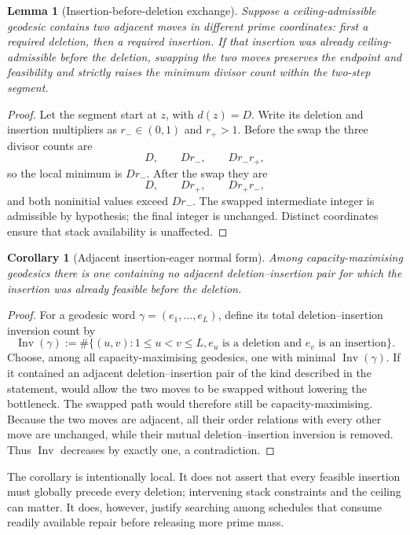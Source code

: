 \documentclass[11pt]{article}
\numberwithin{equation}{section}
\theoremstyle{blueplain}
\newtheorem{lemma}[theorem]{Lemma}
\newtheorem{corollary}[theorem]{Corollary}
\theoremstyle{bluedef}
\begin{document}
\begin{lemma}[Insertion-before-deletion exchange]
\label{lem:exchange}
Suppose a ceiling-admissible geodesic contains two adjacent moves in different prime coordinates: first a required deletion, then a required insertion.  If that insertion was already ceiling-admissible before the deletion, swapping the two moves preserves the endpoint and feasibility and strictly raises the minimum divisor count within the two-step segment.
\end{lemma}

\begin{proof}
Let the segment start at $z$, with $d(z)=D$.  Write its deletion and insertion multipliers as $r_-\in(0,1)$ and $r_+>1$.  Before the swap the three divisor counts are
\[
 D,\qquad Dr_-,\qquad Dr_-r_+,
\]
so the local minimum is $Dr_-$.  After the swap they are
\[
 D,\qquad Dr_+,\qquad Dr_+r_-,
\]
and both noninitial values exceed $Dr_-$.  The swapped intermediate integer is admissible by hypothesis; the final integer is unchanged.  Distinct coordinates ensure that stack availability is unaffected.
\end{proof}

\begin{corollary}[Adjacent insertion-eager normal form]
\label{cor:insertion-eager}
Among capacity-maximising geodesics there is one containing no adjacent deletion--insertion pair for which the insertion was already feasible before the deletion.
\end{corollary}

\begin{proof}
For a geodesic word $\gamma=(e_1,\ldots,e_L)$, define its total deletion--insertion inversion count by
\[
 \operatorname{Inv}(\gamma)
 :=\#\{(u,v):1\le u<v\le L,
 e_u\text{ is a deletion and }e_v\text{ is an insertion}\}.
\]
Choose, among all capacity-maximising geodesics, one with minimal $\operatorname{Inv}(\gamma)$.  If it contained an adjacent deletion--insertion pair of the kind described in the statement,  would allow the two moves to be swapped without lowering the bottleneck.  The swapped path would therefore still be capacity-maximising.  Because the two moves are adjacent, all their order relations with every other move are unchanged, while their mutual deletion--insertion inversion is removed.  Thus $\operatorname{Inv}$ decreases by exactly one, a contradiction.
\end{proof}

The corollary is intentionally local.  It does not assert that every feasible insertion must globally precede every deletion; intervening stack constraints and the ceiling can matter.  It does, however, justify searching among schedules that consume readily available repair before releasing more prime mass.
\end{document}
